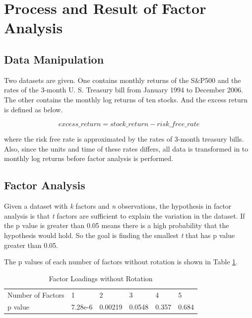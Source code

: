 \documentclass[10pt, conference]{IEEEtran}
\begin{document}


\section{Process and Result of Factor Analysis}
\subsection{Data Manipulation}
Two datasets are given.  One contains monthly returns of the S\&P500 and the rates of the 3-month U. S. Treasury bill from January 1994 to December 2006. The other contains the monthly log returns of ten stocks. And the excess return is defined as below. 

$$ excess\_return = stock\_return - risk\_free\_rate $$

where the risk free rate is approximated by the rates of 3-month treasury bills. Also, since the units and time of these rates differs, all data is transformed in to monthly log returns before factor analysis is performed. 

\subsection{Factor Analysis}
Given a dataset with \emph{k} factors and \emph{n} observations, the hypothesis in factor analysis is that \emph{t} factors are sufficient to explain the variation in the dataset. If the p value is greater than 0.05 means there is a high probability that the hypothesis would hold. So the goal is finding the smallest \emph{t} that has p value greater than 0.05. 

The p values of each number of factors without rotation is shown in Table \ref{tab1}. 

\begin{table}[!h]
\centering
\caption{Factor Loadings without Rotation}
\label{tab1}
\resizebox{9cm}{!} {
\begin{tabular}{llllll}
\hline
Number of Factors & 1       & 2       & 3      & 4     & 5     \\
p value        & 7.28e-6 & 0.00219 & 0.0548 & 0.357 & 0.684 \\
\hline
\end{tabular}
}
\end{table}
\end{document}
